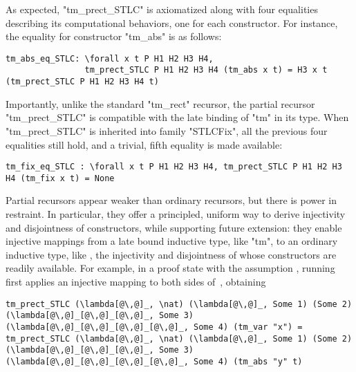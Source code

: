 \noindent
As expected, "tm_prect_STLC" is axiomatized along with
four equalities describing its computational behaviors, one for each constructor.
For instance, the equality for constructor "tm_abs" is as follows:

\begin{centered}
\begin{minipage}{\textwidth}
\begin{lstlisting}[basicstyle=\fontsize{8.25}{9}\ttfamily]
tm_abs_eq_STLC: \forall x t P H1 H2 H3 H4,
                tm_prect_STLC P H1 H2 H3 H4 (tm_abs x t) = H3 x t (tm_prect_STLC P H1 H2 H3 H4 t)
\end{lstlisting}
\end{minipage}
\end{centered}

Importantly, unlike the standard "tm_rect" recursor, the partial recursor
"tm_prect_STLC" is compatible with the late binding of "tm" in its type.
When "tm_prect_STLC" is inherited into family "STLCFix", all the previous four equalities
still hold, and a trivial, fifth equality is made available:

\begin{centered}
\begin{minipage}{.88\textwidth}
\begin{lstlisting}[basicstyle=\fontsize{8.25}{9}\ttfamily]
tm_fix_eq_STLC : \forall x t P H1 H2 H3 H4, tm_prect_STLC P H1 H2 H3 H4 (tm_fix x t) = None
\end{lstlisting}
\end{minipage}
\end{centered}

Partial recursors appear weaker than ordinary recursors,
but there is power in restraint.
In particular,
they offer a principled, uniform way to derive injectivity and disjointness of
constructors, while supporting future extension:
they enable injective mappings from a late bound inductive
type, like "tm", to an ordinary inductive type, like \lsti{\nat},
the injectivity and disjointness of whose constructors are readily
available.
%
For example, in a proof state with the assumption ,
running  first applies an injective mapping to
both sides of~, obtaining

\begin{centered}
\begin{minipage}{.98\textwidth}
\begin{lstlisting}[basicstyle=\fontsize{8.25}{9}\ttfamily]
tm_prect_STLC (\lambda[@\,@]_, \nat) (\lambda[@\,@]_, Some 1) (Some 2) (\lambda[@\,@]_[@\,@]_[@\,@]_, Some 3) (\lambda[@\,@]_[@\,@]_[@\,@]_[@\,@]_, Some 4) (tm_var "x") =
tm_prect_STLC (\lambda[@\,@]_, \nat) (\lambda[@\,@]_, Some 1) (Some 2) (\lambda[@\,@]_[@\,@]_[@\,@]_, Some 3) (\lambda[@\,@]_[@\,@]_[@\,@]_[@\,@]_, Some 4) (tm_abs "y" t)
\end{lstlisting}
\end{minipage}
\end{centered}

